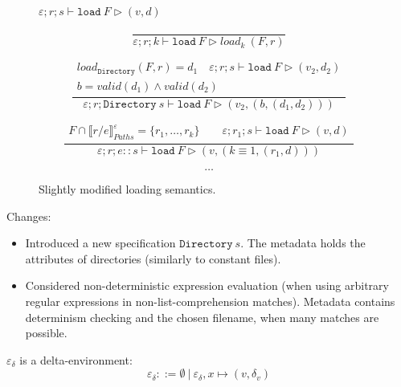 \documentclass{report}
\theoremstyle{theorem}
\begin{document}
\begin{figure}[t]
$\boxed{\varepsilon;r;s \vdash \mathtt{load}~ F \rhd (v,d)}$

\begin{displaymath}
	\frac{}
	{\varepsilon;r;k \vdash \mathtt{load}~ F \rhd {load}_{k}~(F,r)}
\end{displaymath}

\begin{displaymath}
	\frac{\begin{array}{c}
		{load}_{\mathtt{Directory}}(F,r) = d_1 \quad \varepsilon;r;s \vdash \mathtt{load}~ F \rhd (v_2,d_2)\\
		b = valid(d_1) \wedge valid(d_2)
	\end{array}}
	{\varepsilon;r;\mathtt{Directory}~s \vdash \mathtt{load}~ F \rhd (v_2,(b,(d_1,d_2)))}
\end{displaymath}

\begin{displaymath}
	\frac{\begin{array}{c}
		F \cap \llbracket r/e \rrbracket^{\varepsilon}_{Paths} = \{r_1,\dots,r_k\}  \quad
		\quad \varepsilon;r_1;s \vdash \mathtt{load}~ F \rhd (v,d)
	\end{array}}
	{\varepsilon;r;e :: s \vdash \mathtt{load}~ F \rhd (v,(k \equiv 1,(r_1,d))) }
\end{displaymath}

\begin{displaymath}
	\dots
\end{displaymath}

\caption{Slightly modified loading semantics.}
\end{figure}

Changes:
\begin{itemize}
	\item Introduced a new specification $\mathtt{Directory}~s$. The metadata holds the attributes of directories (similarly to constant files).
	\item Considered non-deterministic expression evaluation (when using arbitrary regular expressions in non-list-comprehension matches). Metadata contains determinism checking and the chosen filename, when many matches are possible.
\end{itemize}

$\varepsilon_\delta$ is a delta-environment:
\begin{displaymath}
	\varepsilon_\delta ::= \emptyset ~|~ \varepsilon_\delta,x \mapsto (v,\delta_v)
\end{displaymath}
\end{document}
